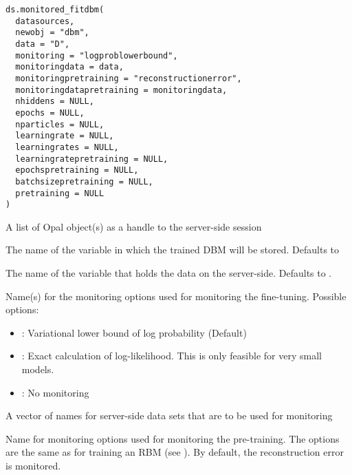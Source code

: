 %
\begin{Usage}
\begin{verbatim}
ds.monitored_fitdbm(
  datasources,
  newobj = "dbm",
  data = "D",
  monitoring = "logproblowerbound",
  monitoringdata = data,
  monitoringpretraining = "reconstructionerror",
  monitoringdatapretraining = monitoringdata,
  nhiddens = NULL,
  epochs = NULL,
  nparticles = NULL,
  learningrate = NULL,
  learningrates = NULL,
  learningratepretraining = NULL,
  epochspretraining = NULL,
  batchsizepretraining = NULL,
  pretraining = NULL
)
\end{verbatim}
\end{Usage}
%
\begin{Arguments}
\begin{ldescription}
\item[\code{datasources}] A list of Opal object(s) as a handle to the server-side session

\item[\code{newobj}] The name of the variable in which the trained DBM will be stored.
Defaults to 

\item[\code{data}] The name of the variable that holds the data on the server-side.
Defaults to .

\item[\code{monitoring}] Name(s) for the monitoring options used for monitoring the fine-tuning.
Possible options:
\begin{itemize}

\item {}: Variational lower bound of log probability (Default)
\item {}: Exact calculation of log-likelihood.
This is only feasible for very small models.
\item {}: No monitoring

\end{itemize}


\item[\code{monitoringdata}] A vector of names for server-side data sets that are to be used for
monitoring

\item[\code{monitoringpretraining}] Name for monitoring options used for monitoring the pre-training.
The options are the same as for
training an RBM (see ).
By default, the reconstruction error is monitored.


\end{ldescription}
\end{Arguments}
